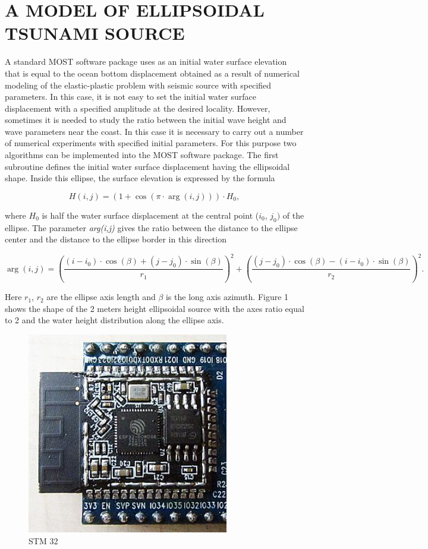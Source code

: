 \documentclass{aip-cp}
\begin{document}
\section{A MODEL OF ELLIPSOIDAL TSUNAMI SOURCE}
A standard MOST software package uses as an initial water surface elevation 
that is equal to the ocean bottom displacement obtained as a result of 
numerical modeling of the elastic-plastic problem with seismic source with 
specified parameters. In this case, it is not easy to set the initial water 
surface displacement with a specified amplitude at the desired locality. 
However, sometimes it is needed to study the ratio between the initial wave 
height and wave parameters near the coast. In this case it is necessary to 
carry out a number of numerical experiments with specified initial 
parameters. For this purpose two algorithms can be implemented into the MOST 
software package. The first subroutine defines the initial water surface 
displacement having the ellipsoidal shape. Inside this ellipse, the surface 
elevation is expressed by the formula

\begin{equation}
\label{eq5}
H(i,j) = \left( {1 + \cos (\pi \cdot \arg (i,j))} \right) \cdot H_0 ,
\end{equation}

\noindent
where $H_{0}$ is half the water surface displacement at the central point 
($i_{0}$, $j_{0})$ of the ellipse. The parameter \textit{arg(i,j)} gives the ratio between the 
distance to the ellipse center and the distance to the ellipse border in 
this direction

\begin{equation}
\label{eq6}
\arg (i,j) = \left( {\frac{(i - i_0 ) \cdot \cos (\beta ) + (j - j_0 ) \cdot 
\sin (\beta )}{r_1 }} \right)^2 + \left( {\frac{(j - j_0 ) \cdot \cos (\beta 
) - (i - i_0 ) \cdot \sin (\beta )}{r_2 }} \right)^2.
\end{equation}

Here $r_{1}$, $r_{2}$ are the ellipse axis length and \textit{$\beta $} is the long axis 
azimuth. Figure 1 shows the shape of the 2 meters height ellipsoidal source 
with the axes ratio equal to 2 and the water height distribution along the 
ellipse axis.

\begin{figure}[ht]
  \centerline{\includegraphics[width=250pt]{art/Fig_01.png}}
  \caption{STM 32}
\end{figure}
\end{document}

